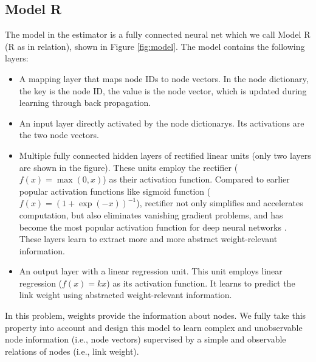 \documentclass[conference]{IEEEtran}
\begin{document}
\subsection{Model R}
The model in the estimator is a fully connected neural net which we call Model 
R (R as in relation), shown in Figure \ref{fig:model}.
The model contains the following layers:
\begin{itemize}
	\item A mapping layer that maps node IDs to node vectors.
	In the node dictionary,
	the key is the node ID,
	the value is the node vector,
	which is updated during learning through back propagation.
	\item An input layer directly activated by the node dictionarys.
	Its activations are the two node vectors.
	\item Multiple fully connected hidden layers of rectified linear units
	(only two layers are shown in the figure).
	These units employ the rectifier ($ f(x) = \max (0, x) $)
	as their activation function.
	Compared to earlier popular activation functions like sigmoid function
	($ f(x) = (1 + \exp(-x))^{-1} $),
	rectifier not only simplifies and accelerates computation,
	but also eliminates vanishing gradient problems,
	and has become the most popular activation function
	for deep neural networks \cite{lecun2015deep}.
	These layers learn to extract more and more abstract weight-relevant 
	information.
	\item An output layer with a linear regression unit.
	This unit employs linear regression ($ f(x) = kx $) as its activation function.
	It learns to predict the link weight
	using abstracted weight-relevant information.
\end{itemize}
In this problem, weights provide the information about nodes.
We fully take this property into account and design this model to learn 
complex and unobservable node information (i.e., node vectors) 
supervised by a simple and observable relations of nodes (i.e., link weight).
\end{document}
